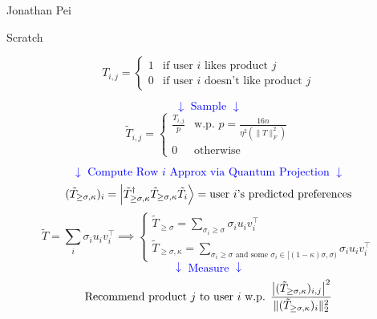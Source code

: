 \documentclass[12pt]{article}
\begin{document}
\noindent Jonathan Pei \hfill 

\begin{center}
  {\large Scratch}
\end{center}

\[T_{i, j} = \begin{cases}
    1 & \text{if user $i$ likes product $j$} \\
    0 & \text{if user $i$ doesn't like product $j$}
  \end{cases}
\]

\textcolor{blue}{
\[\downarrow \text{ Sample } \downarrow \]}
\[\tilde{T}_{i, j} = \begin{cases}
  \frac{T_{i, j}}{p} & \text{w.p. } p = \frac{16n}{\eta^2 (\|T\|_F^2)} \\
  0 & \text{otherwise}
\end{cases}\]

\textcolor{blue}{
\[\downarrow \text{ Compute Row $i$ Approx via Quantum Projection } \downarrow \]}
\[(\tilde{T}_{\geq \sigma, \kappa})_i = \ket{\tilde{T}_{\geq \sigma, \kappa}^\dagger \tilde{T}_{\geq \sigma, \kappa} \tilde{T}_i} = \text{user $i$'s predicted preferences}\]
\[\tilde{T} = \sum_i\sigma_i u_i v_i^{\top} \implies \begin{cases}\tilde{T}_{\geq \sigma} = \sum_{\sigma_i \geq \sigma} \sigma_i u_i v_i^{\top} \\
\tilde{T}_{\geq \sigma, \kappa} = \sum_{\sigma_i \geq \sigma \text{ and some } \sigma_i \in [(1-\kappa)\sigma, \sigma)} \sigma_i u_i v_i^{\top}
\end{cases}\]
\textcolor{blue}{
\[\downarrow \text{ Measure } \downarrow \]}
\[\text{Recommend product $j$ to user $i$ w.p. } \frac{\abs{(\tilde{T}_{\geq \sigma, \kappa})_{i, j}}^2}{\|(\tilde{T}_{\geq \sigma, \kappa})_i\|_2^2}\]
\end{document}
